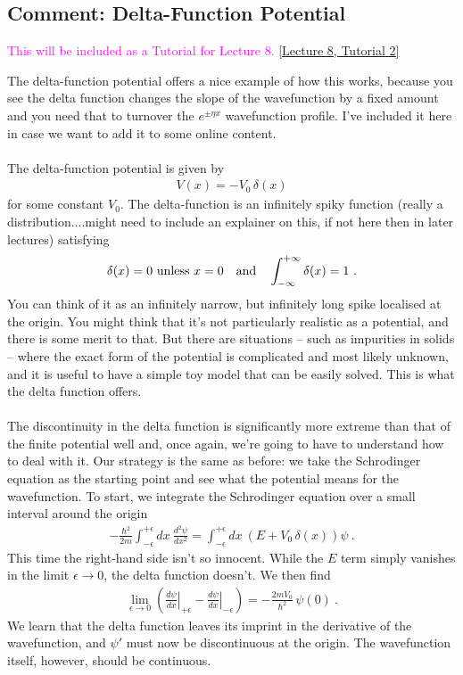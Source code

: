 \documentclass[12pt]{article}
\def\be{\begin{eqnarray}}
\def\ee{\end{eqnarray}}
\newcommand{\nn}{\nonumber}
\newcommand\para{\paragraph{}}
\newcommand{\cblue}{\color{blue}}
\newcommand{\alyssa}{\textcolor{magenta}}
\begin{document}
\subsection*{Comment: Delta-Function Potential}
\alyssa{This will be included as a Tutorial for Lecture 8.} \href{https://drive.google.com/file/d/1gpp5nltJft6RJ99iGAlz_Bhno3Qyn4yf/view?usp=drive_link}{[Lecture 8, Tutorial 2]}
{\cblue The delta-function potential offers a nice example of how this works, because you see the delta function changes the slope of the wavefunction by a fixed amount and you need that to turnover the  $e^{\pm \eta x}$ wavefunction profile. I've included it here in case we want to add it to some online content. 

\para
The delta-function potential is given by
%
\be V(x) = -V_0\, \delta(x)\nn\ee
%
for some constant $V_0$. The delta-function is an infinitely spiky function (really a distribution....might need to include an explainer on this, if not here then in later lectures) satisfying
%
\be \delta(x) = 0\ {\rm unless}\ x=0\ \ \ {\rm and}\ \ \ \int_{-\infty}^{+\infty} \delta(x) =1\ .\ee
%
You can think of it as an infinitely narrow, but infinitely long spike localised at the origin. You might think that it's not particularly realistic as a potential, and there is some merit to that. But there are situations -- such as impurities in solids -- where the exact form of the potential is complicated and most likely unknown, and it is useful to have a simple toy model that can be easily solved. This is what the delta function offers.

\para
The discontinuity in the delta function is significantly more extreme than that of the finite potential well and, once again, we're going to have to understand how to deal with it. Our strategy is the same as before: we take the Schrodinger equation as the starting point and see what the potential means for the wavefunction. To start, we integrate the Schrodinger equation over a small interval around the origin
%
\be -\frac{\hbar^2}{2m}\int_{-\epsilon}^{+\epsilon}dx\ \frac{d^2\psi}{dx^2} = \int_{-\epsilon}^{+\epsilon}dx\ (E+V_0\,\delta(x))\psi\ .\ee
%
This time the right-hand side isn't so innocent. While the $E$ term simply vanishes in the limit $\epsilon\rightarrow 0$, the delta function doesn't. We then find
%
\be \lim_{\epsilon\rightarrow 0} \left( \left.\frac{d\psi}{dx}\right|_{+\epsilon} - \left.\frac{d\psi}{dx}\right|_{-\epsilon}\right)  = -\frac{2mV_0}{\hbar^2}\,\psi(0)\ .\label{ada}\ee
%
We learn that the delta function leaves its imprint in the derivative of the wavefunction, and $\psi'$ must now be discontinuous at the origin. The wavefunction itself, however, should be continuous.


}
\end{document}
